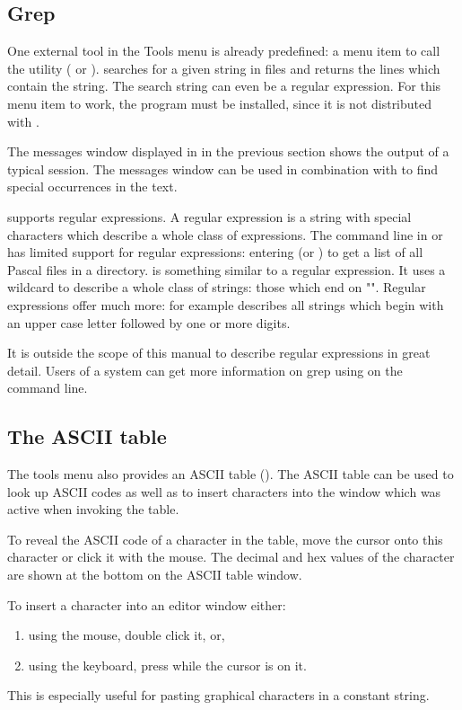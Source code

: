 \subsection{Grep}
\label{se:grep}
One external tool in the Tools menu is already predefined: a
menu item to call the  utility ( or
).  searches for a given string in files and
returns the lines which contain the string. The search string can
even be a regular expression. For this menu item to work, the
 program must be installed, since it is not distributed
with \fpc.

The messages window displayed in  in the previous
section shows the output of a typical  session. The messages
window can be used in combination with  to find special
occurrences in the text.

 supports regular expressions. A regular expression is a
string with special characters which describe a whole class of
expressions. The command line in \dos or \linux has limited
support for regular expressions: entering 
(or ) to get a list of all Pascal files in a
directory.  is something similar to a regular expression.
It uses a wildcard to describe a whole class of strings: those which
end on "".
Regular expressions offer much more: for example \var{[A-Z][0-9]+}
describes all strings which begin with an upper case letter followed by
one or more digits.

It is outside the scope of this manual to describe regular expressions
in great detail. Users of a \linux system can get more information on grep
using  on the command line.
%
%
\subsection{The ASCII table}
\label{se:asciitable}
The tools menu also provides an ASCII table ().
The ASCII table can be used to look up ASCII codes as well as to
insert characters into the window which was active when invoking the
table. 

To reveal the ASCII code of a character in the table, move the
cursor onto this character or click it with the mouse. The decimal
and hex values of the character are shown at the bottom on the
ASCII table window.

To insert a character into an editor window either:
\begin{enumerate}
\item using the mouse, double click it, or,
\item using the keyboard,  press  while the cursor is on it.
\end{enumerate}
This is especially useful for pasting graphical characters in a constant
string.

